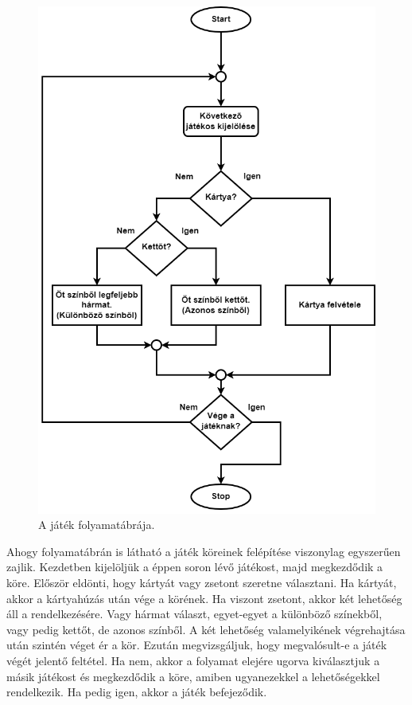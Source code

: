 

\begin{figure}[h]
\centering
\includegraphics[scale=0.3]{images/flowchart.png}
\caption{A játék folyamatábrája.}
\label{fig:flowchart}
\end{figure}


Ahogy folyamatábrán is látható a játék köreinek felépítése viszonylag egyszerűen zajlik. Kezdetben kijelöljük a éppen soron lévő játékost, majd megkezdődik a köre. Először eldönti, hogy kártyát vagy zsetont szeretne választani. Ha kártyát, akkor a kártyahúzás után vége a körének. Ha viszont zsetont, akkor két lehetőség áll a rendelkezésére. Vagy hármat választ, egyet-egyet a különböző színekből, vagy pedig kettőt, de azonos színből. A két lehetőség valamelyikének végrehajtása után szintén véget ér a kör. Ezután megvizsgáljuk, hogy megvalósult-e a játék végét jelentő feltétel. Ha nem, akkor a folyamat elejére ugorva kiválasztjuk a másik játékost és megkezdődik a köre, amiben ugyanezekkel a lehetőségekkel rendelkezik. Ha pedig igen, akkor a játék befejeződik.

